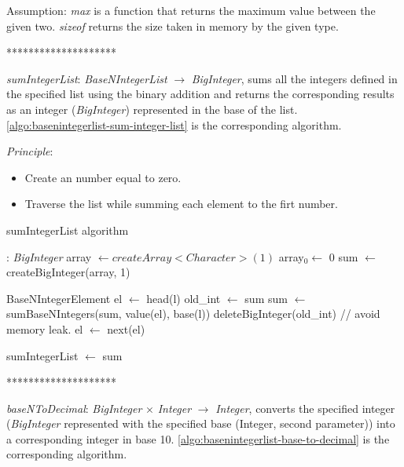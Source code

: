 \documentclass[book, nodocumentinfo]{upmethodology-document}
\newcommand{\separator}{\centerline{********************}}
\begin{document}
Assumption: \emph{max} is a function that returns the maximum value between the given two.
\emph{sizeof} returns the size taken in memory by the given type.

\separator

\emph{sumIntegerList}: \emph{BaseNIntegerList} \(\rightarrow\) \emph{BigInteger},
sums all the integers defined in the specified list using the binary addition and returns
the corresponding results as an integer (\emph{BigInteger}) represented in the base of the list.
\ref{algo:basenintegerlist-sum-integer-list} is the corresponding algorithm.

\emph{Principle}:
\begin{itemize}
    \item Create an number equal to zero.
    \item Traverse the list while summing each element to the firt number.
\end{itemize}

\begin{algorithm}[H]
    \caption{sumIntegerList algorithm}
    \label{algo:basenintegerlist-sum-integer-list}

    \begin{algorithmic}
         : \emph{BigInteger}
            \State array \(\leftarrow createArray<Character>(1)\)
            \State array\(_0 \leftarrow\) 0
            \State sum \(\leftarrow\) createBigInteger(array, 1)

            \State BaseNIntegerElement el \(\leftarrow\) head(l)
                \State old\_int \(\leftarrow\) sum
                \State sum \(\leftarrow\) sumBaseNIntegers(sum, value(el), base(l))
                \State deleteBigInteger(old\_int) // avoid memory leak.
                \State el \(\leftarrow\) next(el)
            \EndWhile

            \State sumIntegerList \(\leftarrow\) sum
        \EndFunction
    \end{algorithmic}
\end{algorithm}

\separator

\emph{baseNToDecimal}: \emph{BigInteger} \(×\) \emph{Integer} \(\rightarrow\) \emph{Integer},
converts the specified integer (\emph{BigInteger} represented with the specified base (Integer, second parameter)) into a corresponding integer in base 10.
\ref{algo:basenintegerlist-base-to-decimal} is the corresponding algorithm.
\end{document}
